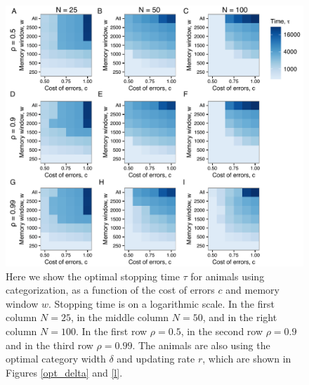 \begin{figure}
\includegraphics[width=6.85in]{figures/time_heat_maps.pdf}
\caption{\sffamily\small\textbf{} Here we show the optimal stopping time $\tau$ for animals using categorization, as a function of the cost of errors $c$ and memory window $w$. Stopping time is on a logarithmic scale. In the first column $N=25$, in the middle column $N=50$, and in the right column $N=100$. In the first row $\rho=0.5$, in the second row $\rho=0.9$ and in the third row $\rho=0.99$. The animals are also using the optimal category width $\delta$ and updating rate $r$, which are shown in Figures \ref{opt_delta} and \ref{l}.}
\label{time}
\end{figure}


